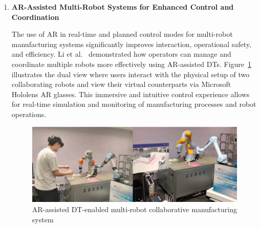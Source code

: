 \begin{enumerate}
    
    
    
    \item \textbf{AR-Assisted Multi-Robot Systems for Enhanced Control and Coordination}
    
    The use of \ac{AR} in real-time and planned control modes for multi-robot manufacturing systems significantly improves interaction, operational 
    safety, and efficiency. Li et al.~\cite{LI2022102321} demonstrated how operators can manage and coordinate multiple robots more effectively using 
    \ac{AR}-assisted DTs. Figure~\ref{fig:physical-digital} illustrates the dual view where users interact with the physical setup of two collaborating 
    robots and view their virtual counterparts via Microsoft Hololens \ac{AR} glasses. This immersive and intuitive control experience allows for 
    real-time simulation and monitoring of manufacturing processes and robot operations.
    
    \begin{figure}[!htpb]
        \centering
        \includegraphics[width=0.85\linewidth]{figs/physical-digital.png}
        \caption{\ac{AR}-assisted \ac{DT}-enabled multi-robot collaborative manufacturing system \cite{LI2022102321}}
        \label{fig:physical-digital}
    \end{figure}


\end{enumerate}
